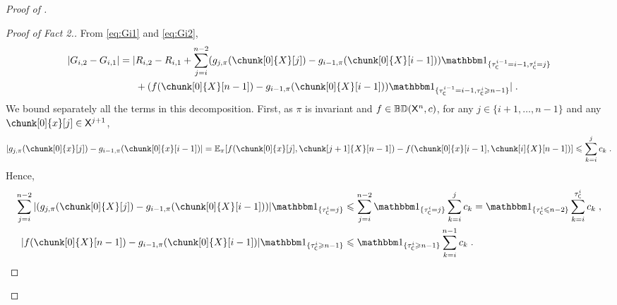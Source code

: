 \documentclass[leqno,11pt,a4paper]{article}
\begin{document}
\begin{proof}[Proof of ]
\begin{proof}[Proof of Fact 2.]
From \eqref{eq:Gi1} and \eqref{eq:Gi2},
\begin{align}
\label{eq:Gi1-Gi2} |G_{i,2}-G_{i,1}|=|&R_{i,2}-R_{i,1}+\sum_{j=i}^{n-2}(g_{j,\pi}(\chunk[0]{X}[j])-g_{i-1,\pi}(\chunk[0]{X}[i-1]))\indiacc{\tau_{\cC}^{i-1}=i-1,\tau_{\cC}^i=j}\\
\notag &+(f(\chunk[0]{X}[n-1])-g_{i-1,\pi}(\chunk[0]{X}[i-1]))\indiacc{\tau_{\cC}^{i-1}=i-1,\tau_{\cC}^i\geqslant n-1}|
\eqsp.
\end{align}
We bound separately all the terms in this decomposition.
First, as $\pi$ is invariant and $f\in \mathbb{BD}(\mathsf{X}^n,c)$, for any $j\in \{i+1,\ldots,n-1\}$ and any $\chunk[0]{x}[j]\in \sX^{j+1}$,
\[
|g_{j,\pi}(\chunk[0]{x}[j])-g_{i-1,\pi}(\chunk[0]{x}[i-1])|=\Ebb_{\pi}[f(\chunk[0]{x}[j],\chunk[j+1]{X}[n-1])-f(\chunk[0]{x}[i-1],\chunk[i]{X}[n-1])]\leqslant \sum_{k=i}^jc_k\eqsp.
\]
Hence,
\begin{equation}
\label{eq:Bound:Easyterms}
\begin{aligned} \sum_{j=i}^{n-2}|(g_{j,\pi}(\chunk[0]{X}[j])-g_{i-1,\pi}(\chunk[0]{X}[i-1]))|\indiacc{\tau_{\cC}^i=j}&\leqslant \sum_{j=i}^{n-2}\indiacc{\tau_{\cC}^i=j}\sum_{k=i}^jc_k=\indiacc{\tau_{\cC}^i\leqslant n-2}\sum_{k=i}^{\tau_{\cC}^i}c_k\eqsp,\\
|f(\chunk[0]{X}[n-1])-g_{i-1,\pi}(\chunk[0]{X}[i-1])|\indiacc{\tau_{\cC}^i\geqslant n-1}&\leqslant \indiacc{\tau_{\cC}^i\geqslant n-1}\sum_{k=i}^{n-1}c_k\eqsp.
\end{aligned}
\end{equation}




\end{proof}
\end{proof}
\end{document}
